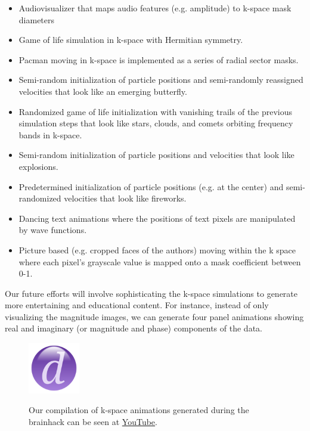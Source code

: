 \documentclass{article}
\begin{document}
\begin{itemize}
\item Audiovisualizer that maps audio features (e.g. amplitude) to k-space mask diameters
\item Game of life \cite{Gardner1970} simulation in k-space with Hermitian symmetry.
\item Pacman moving in k-space is implemented as a series of radial sector masks.
\item Semi-random initialization of particle positions and semi-randomly reassigned velocities that look like an emerging butterfly.
\item Randomized game of life initialization with vanishing trails of the previous simulation steps that look like stars, clouds, and comets orbiting frequency bands in k-space.
\item Semi-random initialization of particle positions and velocities that look like explosions.
\item Predetermined initialization of particle positions (e.g. at the center) and semi-randomized velocities that look like fireworks.
\item Dancing text animations where the positions of text pixels are manipulated by wave functions.
\item Picture based (e.g. cropped faces of the authors) moving within the k space where each pixel’s grayscale value is mapped onto a mask coefficient between 0-1.
\end{itemize}

Our future efforts will involve sophisticating the k-space simulations to generate more entertaining and educational content. For instance, instead of only visualizing the magnitude images, we can generate four panel animations showing real and imaginary (or magnitude and phase) components of the data.

\begin{figure}[h]
    \centering
    \includegraphics[width=0.2\textwidth]{images/placeholder.png}
    \label{fig:kparticles}
    \caption{
        Our compilation of k-space animations generated during the brainhack can be seen at \href{https://youtu.be/XS0LEQExGU8?si=I5Zufp3AcCbdhYIR}{YouTube}.
    }
\end{figure}
\end{document}

